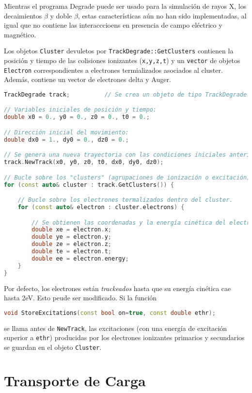 Mientras el programa Degrade puede ser usado para la simulación de rayos X, los decaimientos $\beta$ y doble $\beta$, estas características aún no han sido implementadas, al igual que no contiene las interacccioens en presencia de campo eléctrico y magnético. 


Los objetos \texttt{Cluster} devuletos por \texttt{TrackDegrade::GetClusters} contienen la posición y tiempo de las colisiones ionizantes (\texttt{x,y,z,t}) y un \texttt{vector} de objetos \texttt{Electron} correspondientes a electrones termializados asociados al cluster. Además, contiene un vector de electrones delta y Auger. \\


\begin{lstlisting}[language=C++,style=c++]
TrackDegrade track;          // Se crea un objeto de tipo TrackDegrade 

// Variables iniciales de posición y tiempo:
double x0 = 0., y0 = 0., z0 = 0., t0 = 0.;

// Dirección inicial del movimiento:
double dx0 = 1., dy0 = 0., dz0 = 0.;

// Se genera una nueva trayectoria con las condiciones iniciales anteriores:
track.NewTrack(x0, y0, z0, t0, dx0, dy0, dz0);

// Bucle sobre los "clusters" (agrupaciones de ionización o excitación) a lo largo de la trayectoria.
for (const auto& cluster : track.GetClusters()) {

    // Bucle sobre los electrones termalizados dentro del cluster.
    for (const auto& electron : cluster.electrons) {

        // Se obtienen las coordenadas y la energía cinética del electrón.
        double xe = electron.x;
        double ye = electron.y;
        double ze = electron.z;
        double te = electron.t;
        double ee = electron.energy;
    }
}
\end{lstlisting}
\vspace*{0.6em}
Por defecto, los electrones están \textit{trackeados} hasta que su energía cinética cae hasta 2eV. Esto peude ser modificado.  Si la función \\

\begin{lstlisting}[language=C++,style=c++]
void StoreExcitations(const bool on=true, const double ethr);
\end{lstlisting}
\vspace*{0.6em}
se llama antes de \texttt{NewTrack}, las excitaciones (con una energía de excitación superior a \texttt{ethr}) producidas por los electrones ionizantes primarios y secundarios se guardan en el objeto \texttt{Cluster}.

\section{Transporte de Carga}